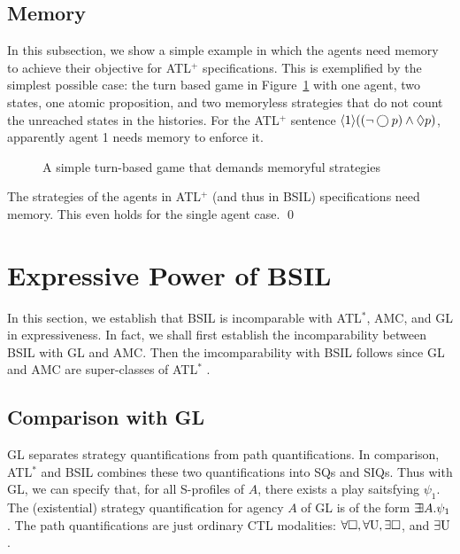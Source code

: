 \subsection{Memory}
In this subsection, we show a simple example in which \label{reply1.in.which}  
the agents need memory to achieve their objective for ATL$^+$ 
specifications.
This is\label{reply1.is.is} exemplified by the simplest possible case: 
the turn based game in Figure~\ref{fig.gg.fin} 
with one agent, two states, one atomic proposition, 
and two memoryless strategies 
that do not count the unreached states in the histories.
For the ATL$^+$ sentence \label{reply2.mem.fin.parenthesis} 
$\langle 1 \rangle ((\neg \bigcirc p)\wedge \Diamond p)$, 
apparently agent 1 needs memory to enforce it.  
\begin{figure}[t]
\begin{center} 

\end{center}
\caption{A simple turn-based game that demands memoryful strategies}
\label{fig.gg.fin}
\end{figure}

{\lemma \label{lemma.mem.fin}
The strategies of the agents in ATL$^+$ 
(and thus in BSIL) specifications need memory.
This even holds for the single agent case.
\qed 
}


\section{Expressive Power of BSIL}
In this section, we establish that BSIL is incomparable with ATL$^*$, 
AMC, and GL \cite{AHK02} in expressiveness.
In fact, we shall first establish the incomparability between BSIL with 
GL and AMC.  
Then the imcomparability with BSIL follows since GL and AMC are super-classes of 
ATL$^*$ \cite{AHK02}.
\subsection{Comparison with GL}
GL separates strategy quantifications\label{reply1.quantificaitons} from path quantifications.  
In comparison, ATL$^*$ and BSIL combines these two quantifications 
into SQs and SIQs.  
Thus with GL, we can specify that, for all S-profiles of $A$, 
there exists a play saitsfying $\psi_1$.  
The (existential) strategy quantification for agency $A$ 
of GL is of the form $\mbox{$\exists\!\!\exists$} A.\psi_1$.  
The path quantifications are just ordinary CTL modalities: 
$\forall\Box, \forall\textrm{U}, \exists\Box$, and 
$\exists\textrm{U}$.  

